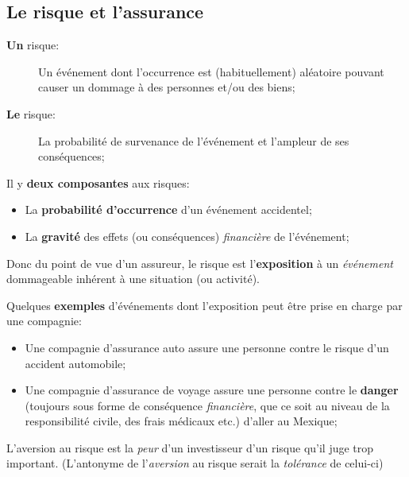 \documentclass[10pt, french]{article}
\begin{document}
\begin{multicols*}{3} 
\section{Le risque et l'assurance}
\begin{definitionNOHFILL}[Risque]
\begin{description}
	\item[\textbf{Un} risque:] Un événement dont l'occurrence est (habituellement) aléatoire pouvant causer un dommage à des personnes et/ou des biens;
	\item[\textbf{Le} risque:] La probabilité de survenance de l'événement et l'ampleur de ses conséquences;
\end{description}

Il y \textbf{deux composantes} aux risques:
\begin{itemize}
	\item	La \textbf{probabilité d'occurrence} d'un événement accidentel;
	\item	La \textbf{gravité} des effets (ou conséquences) \textit{financière} de l'événement;
\end{itemize}

Donc du point de vue d'un assureur, le risque est l'\textbf{exposition} à un \textit{événement} dommageable inhérent à une situation (ou activité). 

Quelques \textbf{exemples} d'événements dont l'exposition peut être prise en charge par une compagnie:
\begin{itemize}
	\item	Une compagnie d'assurance auto assure une personne contre le risque d'un accident automobile;
	\item	Une compagnie d'assurance de voyage assure une personne contre le \textbf{danger} (toujours sous forme de conséquence \textit{financière}, que ce soit au niveau de la responsibilité civile, des frais médicaux etc.) d'aller au Mexique;
\end{itemize}
\end{definitionNOHFILL}

\begin{definitionNOHFILL}[Aversion]
L'aversion au risque est la \textit{peur} d'un investisseur d'un risque qu'il juge trop important.
(L'antonyme de l'\textit{aversion} au risque serait la \textit{tolérance} de celui-ci)


\end{definitionNOHFILL}
\end{multicols*}
\end{document}
